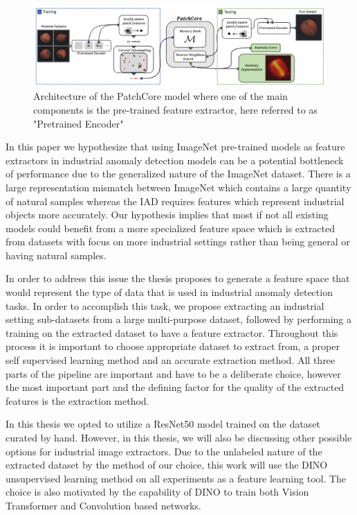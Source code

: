 \begin{figure}[h]
\begin{center}
\includegraphics[width=1.0\linewidth]{Chapter_1/patchcore.png}
\end{center}
\caption{Architecture of the PatchCore model where one of the main components is the pre-trained feature extractor, here referred to as "Pretrained Encoder"}
\label{fig:patchcore}
\end{figure}

In this paper we hypothesize that using ImageNet pre-trained models as feature extractors in industrial anomaly detection models can be a potential bottleneck of performance due to the generalized nature of the ImageNet dataset. There is a large representation mismatch between ImageNet which contains a large quantity of natural samples whereas the IAD requires features which represent industrial objects more accurately. Our hypothesis implies that most if not all existing models could benefit from a more specialized feature space which is extracted from datasets with focus on more industrial settings rather than being general or having natural samples.

In order to address this issue the thesis proposes to generate a feature space that would represent the type of data that is used in industrial anomaly detection tasks. In order to accomplish this task, we propose extracting an industrial setting sub-datasets from a large multi-purpose dataset, followed by performing a training on the extracted dataset to have a feature extractor. Throughout this process it is important to choose appropriate dataset to extract from, a proper self supervised learning method and an accurate extraction method. All three parts of the pipeline are important and have to be a deliberate choice, however the most important part and the defining factor for the quality of the extracted features is the extraction method.

In this thesis we opted to utilize a ResNet50 model trained on the dataset curated by hand. However, in this thesis, we will also be discussing other possible options for industrial image extractors. Due to the unlabeled nature of the extracted dataset by the method of our choice, this work will use the DINO unsupervised learning method on all experiments as a feature learning tool. The choice is also motivated by the capability of DINO to train both Vision Transformer and Convolution based networks.

